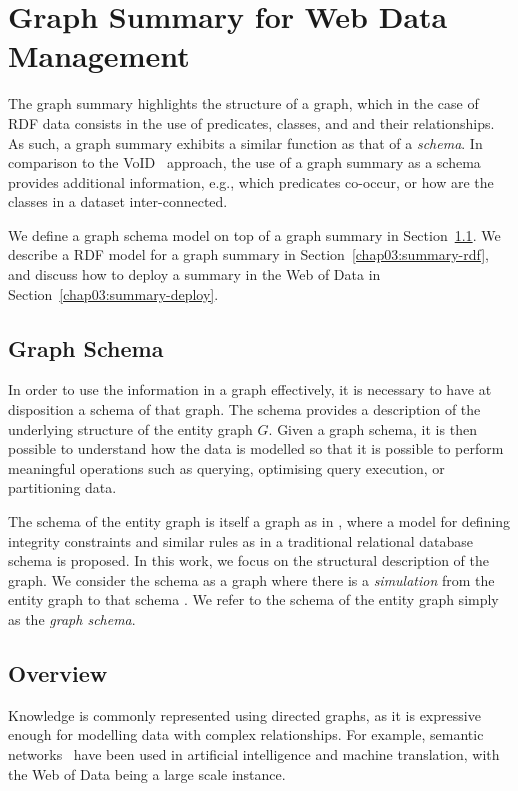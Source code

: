 \section{Graph Summary for Web Data Management}
\label{chap03:sec:wd-mgnt}

The graph summary highlights the structure of a graph, which in the case of RDF data consists in the use of predicates, classes, and and their relationships. As such, a graph summary exhibits a similar function as that of a \emph{schema}. In comparison to the VoID~\cite{alexander:2009:dld} approach, the use of a graph summary as a schema provides additional information, e.g., which predicates co-occur, or how are the classes in a dataset inter-connected.

We define a graph schema model on top of a graph summary in Section~\ref{chap03:sec:gschema}. We describe a RDF model for a graph summary in Section~\ref{chap03:summary-rdf}, and discuss how to deploy a summary in the Web of Data in Section~\ref{chap03:summary-deploy}.

\subsection{Graph Schema}
\label{chap03:sec:gschema}

In order to use the information in a graph effectively, it is necessary to have at disposition a schema of that graph. The schema provides a description of the underlying structure of the entity graph $G$. Given a graph schema, it is then possible to understand how the data is modelled so that it is possible to perform meaningful operations such as querying, optimising query execution, or partitioning data.

The schema of the entity graph is itself a graph as in \cite{kunii1983graph}, where a model for defining integrity constraints and similar rules as in a traditional relational database schema is proposed. In this work, we focus on the structural description of the graph. We consider the schema as a graph where there is a \emph{simulation} from the entity graph to that schema \cite{wang:2000:ags}. We refer to the schema of the entity graph simply as the \emph{graph schema}.

\subsection{Overview}

Knowledge is commonly represented using directed graphs, as it is expressive enough for modelling data with complex relationships. For example, semantic networks~\cite{sowa2006semantic} have been used in artificial intelligence and machine translation, with the Web of Data being a large scale instance.


